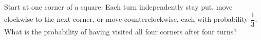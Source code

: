 Start at one corner of a square. Each turn independently stay put, move clockwise to the next corner, or move counterclockwise, each with probability $\dfrac{1}{3}$. What is the probability of having visited all four corners after four turns?
